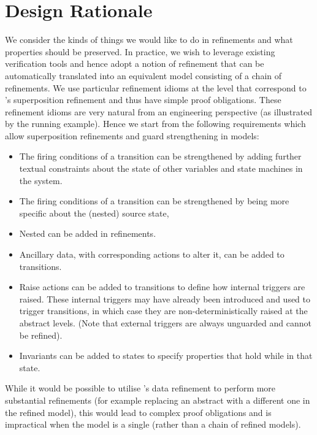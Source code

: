 
\section{Design Rationale}
\label{sec:discussion}
 
We consider the kinds of things we would like to do in \SCXML refinements and what properties should be preserved.
In practice, we wish to leverage existing \EventB verification tools and hence adopt a notion of refinement that can be automatically translated into an equivalent \EventB model consisting of a chain of refinements.
We use particular refinement idioms at the \statechart level that correspond to \EventB's superposition refinement and thus have simple proof obligations. 
These refinement idioms are very natural from an engineering perspective (as illustrated by the running example).
Hence we start from the following requirements which allow superposition refinements and guard strengthening in \SCXML models:
\begin{itemize}
	\item The firing conditions of a transition can be strengthened by adding further textual constraints about the state of other variables and state machines in the system.
	\item The firing conditions of a transition can be strengthened by being more specific about the (nested) source state,
	\item Nested \Statecharts can be added in refinements.
	\item Ancillary data, with corresponding actions to alter it, can be added to transitions.
	\item Raise actions can be added to transitions to define how internal triggers are raised. These internal triggers may have already been introduced and used to trigger transitions, in which case they are non-deterministically raised at the abstract levels. (Note that external triggers are always unguarded and cannot be refined).
	\item Invariants can be added to states to specify properties that hold while in that state.
\end{itemize}
While it would be possible to utilise \EventB's data refinement to perform more substantial \statechart refinements (for example replacing an abstract \statechart with a different one in the refined model), this would lead to complex proof obligations and is impractical when the \SCXML model is a single \Statechart (rather than a chain of refined models).

